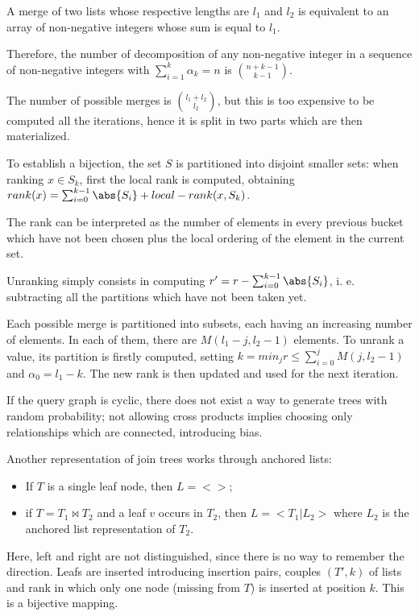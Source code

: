 A merge of two lists whose respective lengths are $l_1$ and $l_2$ is equivalent to an array of non-negative integers whose sum is equal to $l_1$. 

Therefore, the number of decomposition of any non-negative integer in a sequence of non-negative integers with $\sum_{i=1}^{k} \alpha_k = n$ is ${n+k-1}\choose{k-1}$.

The number of possible merges is ${l_1+l_2}\choose{l_2}$, but this is too expensive to be computed all the iterations, hence it is split in two parts which are then materialized. 

To establish a bijection, the set $S$ is partitioned into disjoint smaller sets: when ranking $x \in S_k$, first the local rank is computed, obtaining $rank(x) = \sum_{i=0}^{k-1} \abs{S_i} + local-rank(x, S_k)$.

The rank can be interpreted as the number of elements in every previous bucket which have not been chosen plus the local ordering of the element in the current set. 

Unranking simply consists in computing $r' = r - \sum_{i=0}^{k-1} \abs{S_i}$, i. e. subtracting all the partitions which have not been taken yet. 

Each possible merge is partitioned into subsets, each having an increasing number of elements. In each of them, there are $M(l_1 - j, l_2 - 1)$ elements. To unrank a value, its partition is firstly computed, setting $k = min_j r \leq \sum_{i=0}^{j} M(j, l_2 - 1)$ and $\alpha_0 = l_1 - k$. The new rank is then updated and used for the next iteration.

If the query graph is cyclic, there does not exist a way to generate trees with random probability; not allowing cross products implies choosing only relationships which are connected, introducing bias. 

Another representation of join trees works through anchored lists:
\begin{itemize}
	\item If $T$ is a single leaf node, then $L = <>$;
	\item if $T = T_1 \bowtie T_2$ and a leaf $v$ occurs in $T_2$, then $L = <T_1 | L_2>$ where $L_2$ is the anchored list representation of $T_2$.
\end{itemize}
Here, left and right are not distinguished, since there is no way to remember the direction. Leafs are inserted introducing insertion pairs, couples $(T', k)$ of lists and rank in which only one node (missing from $T$) is inserted at position $k$. This is a bijective mapping.

